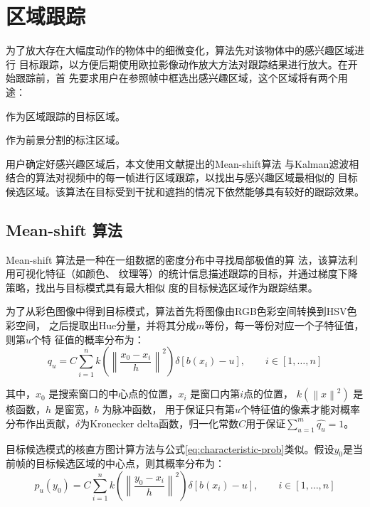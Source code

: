 \section{区域跟踪}
\label{sec:tracking}

为了放大存在大幅度动作的物体中的细微变化，算法先对该物体中的感兴趣区域进行
目标跟踪，以方便后期使用欧拉影像动作放大方法对跟踪结果进行放大。在开始跟踪前，首
先要求用户在参照帧中框选出感兴趣区域，这个区域将有两个用途：

\begin{compactenum}
\item 作为区域跟踪的目标区域。
\item 作为前景分割的标注区域。
\end{compactenum}

用户确定好感兴趣区域后，本文使用文献\cite{常发亮2007}提出的Mean-shift算法
与Kalman滤波相结合的算法对视频中的每一帧进行区域跟踪，以找出与感兴趣区域最相似的
目标候选区域。该算法在目标受到干扰和遮挡的情况下依然能够具有较好的跟踪效果。

\subsection{Mean-shift 算法}
\label{sec:mean-shift}

Mean-shift 算法是一种在一组数据的密度分布中寻找局部极值的算
法，该算法利用可视化特征（如颜色、
纹理等）的统计信息描述跟踪的目标，并通过梯度下降策略，找出与目标模式具有最大相似
度的目标候选区域作为跟踪结果。

为了从彩色图像中得到目标模式，算法首先将图像由RGB色彩空间转换到HSV色彩空间，
之后提取出Hue分量，并将其分成$m$等份，每一等份对应一个子特征值，则第$u$个特
征值的概率分布为：
\begin{equation}
  \label{eq:characteristic-prob}
  q_{u}=C\sum_{i=1}^{n}k\left( \left\| \frac{x_{0}-x_{i}}{h} \right\|^{2}
  \right)\delta[b(x_{i})-u],\qquad i\in[1,\ldots,n]
\end{equation}

其中，$x_{0}$ 是搜索窗口的中心点的位置，$x_{i}$ 是窗口内第$i$点的位置，
$k\left( \left\| x \right\|^{2} \right)$ 是核函数，$h$ 是窗宽，$b$ 为脉冲函数，
用于保证只有第$u$个特征值的像素才能对概率分布作出贡献，$\delta$为Kronecker
delta函数，归一化常数$C$用于保证$\sum_{u=1}^{m}\hat{q_u}=1$。

目标候选模式的核直方图计算方法与公式\ref{eq:characteristic-prob}类似。假设$y_0$是当前帧的目标候选区域的中心点，则其概率分布为：
\begin{equation}
  \label{eq:target-candidate}
  p_{u}(y_0)=C\sum_{i=1}^{n}k\left( \left\| \frac{y_{0}-x_{i}}{h} \right\|^{2}
  \right)\delta[b(x_{i})-u],\qquad i\in[1,\ldots,n]
\end{equation}

